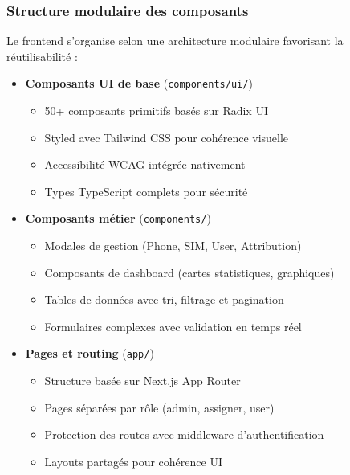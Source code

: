 \documentclass[12pt,a4paper]{report}
\begin{document}
\subsubsection{Structure modulaire des composants}
Le frontend s'organise selon une architecture modulaire favorisant la réutilisabilité :

\begin{itemize}
\item \textbf{Composants UI de base} (\texttt{components/ui/})
  \begin{itemize}
  \item 50+ composants primitifs basés sur Radix UI
  \item Styled avec Tailwind CSS pour cohérence visuelle
  \item Accessibilité WCAG intégrée nativement
  \item Types TypeScript complets pour sécurité
  \end{itemize}

\item \textbf{Composants métier} (\texttt{components/})
  \begin{itemize}
  \item Modales de gestion (Phone, SIM, User, Attribution)
  \item Composants de dashboard (cartes statistiques, graphiques)
  \item Tables de données avec tri, filtrage et pagination
  \item Formulaires complexes avec validation en temps réel
  \end{itemize}

\item \textbf{Pages et routing} (\texttt{app/})
  \begin{itemize}
  \item Structure basée sur Next.js App Router
  \item Pages séparées par rôle (admin, assigner, user)
  \item Protection des routes avec middleware d'authentification
  \item Layouts partagés pour cohérence UI
  \end{itemize}
\end{itemize}
\end{document}
